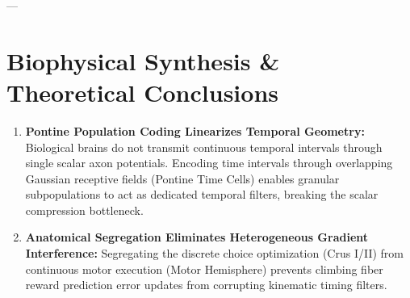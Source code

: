 \documentclass[11pt,twoside,a4paper]{article}
\begin{document}
---

\section{Biophysical Synthesis \& Theoretical Conclusions}

\begin{enumerate}
    \item \textbf{Pontine Population Coding Linearizes Temporal Geometry:}
    Biological brains do not transmit continuous temporal intervals through single scalar axon potentials. Encoding time intervals through overlapping Gaussian receptive fields (Pontine Time Cells) enables granular subpopulations to act as dedicated temporal filters, breaking the scalar compression bottleneck.
    
    \item \textbf{Anatomical Segregation Eliminates Heterogeneous Gradient Interference:}
    Segregating the discrete choice optimization (Crus I/II) from continuous motor execution (Motor Hemisphere) prevents climbing fiber reward prediction error updates from corrupting kinematic timing filters.
\end{enumerate}
\end{document}
